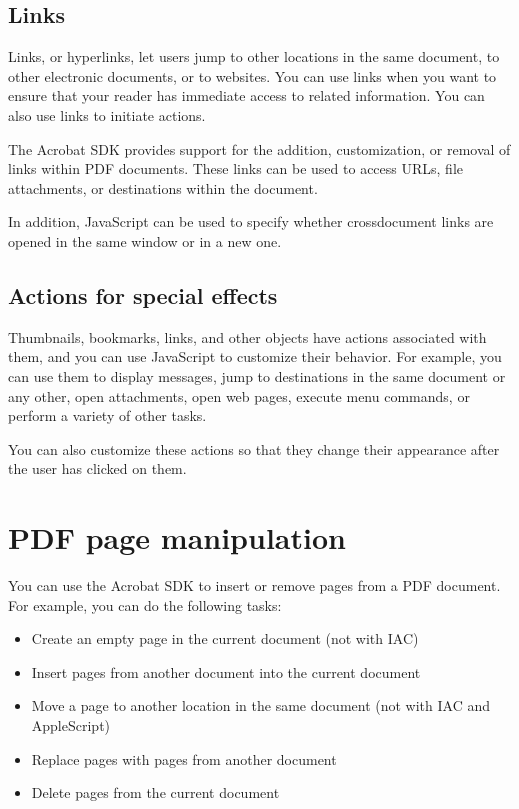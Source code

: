 \documentclass[letterpaper,12pt,english,openany,oneside]{sphinxmanual}
\begin{document}
\subsection{Links}
\label{\detokenize{Overview_Editing:links}}
Links, or hyperlinks, let users jump to other locations in the same document, to other electronic documents, or to websites. You can use links when you want to ensure that your reader has immediate access to related information. You can also use links to initiate actions.

The Acrobat SDK provides support for the addition, customization, or removal of links within PDF documents. These links can be used to access URLs, file attachments, or destinations within the document.

In addition, JavaScript can be used to specify whether cross\sphinxhyphen{}document links are opened in the same window or in a new one.




\subsection{Actions for special effects}
\label{\detokenize{Overview_Editing:actions-for-special-effects}}
Thumbnails, bookmarks, links, and other objects have actions associated with them, and you can use JavaScript to customize their behavior. For example, you can use them to display messages, jump to destinations in the same document or any other, open attachments, open web pages, execute menu commands, or perform a variety of other tasks.

You can also customize these actions so that they change their appearance after the user has clicked on them.




\section{PDF page manipulation}
\label{\detokenize{Overview_Editing:pdf-page-manipulation}}
You can use the Acrobat SDK to insert or remove pages from a PDF document. For example, you can do the following tasks:
\begin{itemize}
\item {} 
Create an empty page in the current document (not with IAC)

\item {} 
Insert pages from another document into the current document

\item {} 
Move a page to another location in the same document (not with IAC and AppleScript)

\item {} 
Replace pages with pages from another document

\item {} 
Delete pages from the current document

\end{itemize}
\end{document}
